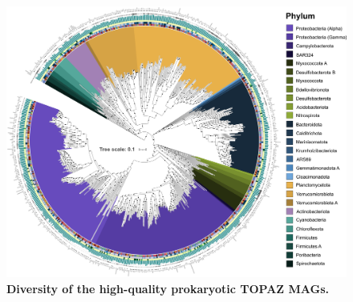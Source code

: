 \documentclass[12pt]{article}
\numberwithin{equation}{section}
\begin{document}
\begin{figure}[h!]    
    \centering
    \includegraphics[width = 0.95\columnwidth]{figures/Figure1-TOPAZ-HQ-NR_bac.png}
    \caption{\textbf{Diversity of the high-quality prokaryotic TOPAZ MAGs.} }
    \label{fig:fig4-trophy}
\end{figure}
\end{document}
